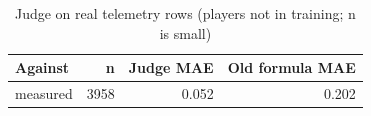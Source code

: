 \begin{table}[ht]
\centering
\small
\begin{tabular}{lrrr}
\toprule
Against & n & Judge MAE & Old formula MAE \\
\midrule
measured & 3958 & 0.052 & 0.202 \\
\bottomrule
\end{tabular}
\caption{Judge on real telemetry rows (players not in training; n is small)}
\label{tab:judge_real_check}
\end{table}
